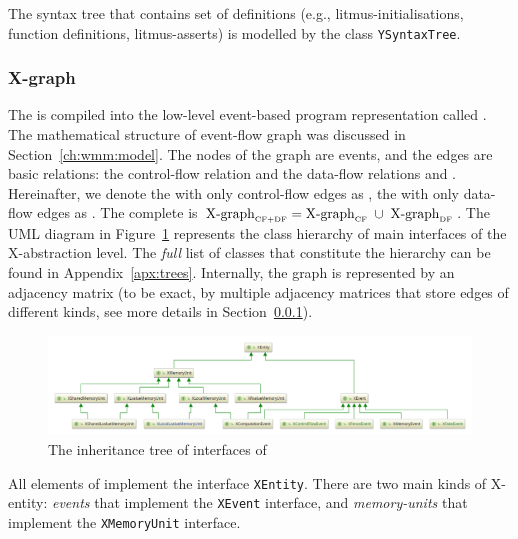 The syntax tree that contains set of definitions (e.g., litmus-initialisations, function definitions, litmus-asserts) is modelled by the class \texttt{YSyntaxTree}.


\subsubsection{X-graph}
\label{ch:impl:model:xgraph}

The \ytree{} is compiled into the low-level event-based program representation called \textit{\xgraph{}}.
The mathematical structure of event-flow graph was discussed in Section~\ref{ch:wmm:model}.
The nodes of the graph are events, and the edges are basic relations: the control-flow relation \po{} and the data-flow relations \co{} and \rf{}.
Hereinafter, we denote the \xgraph{} with only control-flow edges as \xgraph[CF], the \xgraph{} with only data-flow edges as \xgraph[CF].
The complete \xgraph{} is $\xgraph[CF+DF] = \xgraph[CF] \; \cup \; \xgraph[DF]$.
The UML diagram in Figure~\ref{fig:class-diagrams:XEntity-interfaces} represents the class hierarchy%
%
%
%
of main interfaces of the X-abstraction level.
The \textit{full} list of classes that constitute the \xgraph{} hierarchy can be found in Appendix~\ref{apx:trees}.
Internally, the graph is represented by an adjacency matrix (to be exact, by multiple adjacency matrices that store edges of different kinds, see more details in Section~\ref{ch:impl:model:xgraph}).

\begin{figure}[t]%
  \centering
  \includegraphics[width=\textwidth,keepaspectratio]{img/my/class-diagrams/XEntity-interfaces.png}
  \caption{The inheritance tree of interfaces of \xgraph{}}
  \label{fig:class-diagrams:XEntity-interfaces}
\end{figure}

All elements of \xgraph{} implement the interface \texttt{XEntity}.
There are two main kinds of X-entity: \textit{events} that implement the \texttt{XEvent} interface, and \textit{memory-units} that implement the \texttt{XMemoryUnit} interface.

